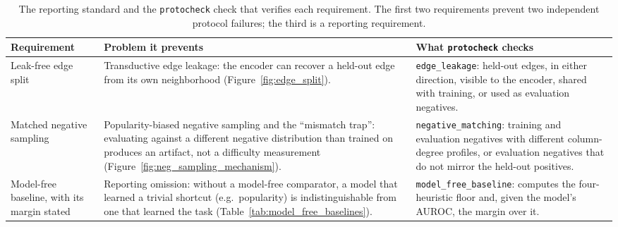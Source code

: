\begin{table}[h!]
\caption{The reporting standard and the \texttt{protocheck} check that verifies each requirement. The first two requirements prevent two independent protocol failures; the third is a reporting requirement.}
\label{tab:correct_protocol}
\small
\begin{tabular}{p{3.1cm}p{4.7cm}p{5.4cm}}
\hline
Requirement & Problem it prevents & What \texttt{protocheck} checks \\
\hline
Leak-free edge split & Transductive edge leakage: the encoder can recover a held-out
edge from its own neighborhood (Figure~\ref{fig:edge_split}). & \texttt{edge\_leakage}: held-out edges, in either
direction, visible to the encoder, shared with training, or used as evaluation negatives. \\
Matched negative sampling & Popularity-biased negative sampling and
the ``mismatch trap'': evaluating against a different negative distribution than
trained on produces an artifact, not a difficulty measurement (Figure~\ref{fig:neg_sampling_mechanism}). & \texttt{negative\_matching}: training
and evaluation negatives with different column-degree profiles, or evaluation negatives that do
not mirror the held-out positives. \\
Model-free baseline, with its margin stated & Reporting omission: without a model-free comparator, a model that learned a
trivial shortcut (e.g.\ popularity) is indistinguishable from one that learned the
task (Table~\ref{tab:model_free_baselines}). & \texttt{model\_free\_baseline}:
computes the four-heuristic floor and, given the model's AUROC, the margin over it. \\
\hline
\end{tabular}
\end{table}
